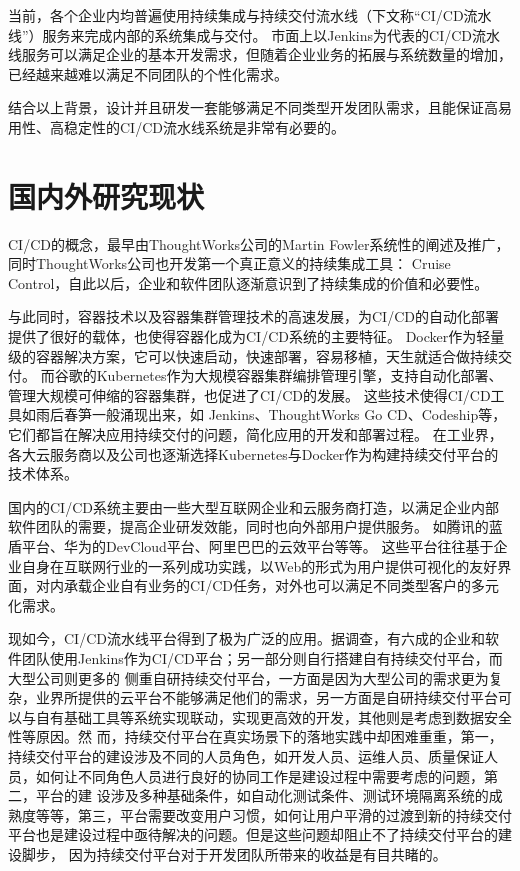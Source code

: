 当前，各个企业内均普遍使用持续集成与持续交付流水线（下文称“CI/CD流水线”）服务来完成内部的系统集成与交付\cite{1013369056.nh}。
市面上以Jenkins为代表的CI/CD流水线服务可以满足企业的基本开发需求，但随着企业业务的拓展与系统数量的增加，已经越来越难以满足不同团队的个性化需求。

结合以上背景，设计并且研发一套能够满足不同类型开发团队需求，且能保证高易用性、高稳定性的CI/CD流水线系统是非常有必要的。


\section{国内外研究现状}
CI/CD的概念，最早由ThoughtWorks公司的Martin Fowler系统性的阐述及推广\cite{CI首作}，同时ThoughtWorks公司也开发第一个真正意义的持续集成工具：
Cruise Control\cite{绪论持续集成1}，自此以后，企业和软件团队逐渐意识到了持续集成的价值和必要性。

与此同时，容器技术以及容器集群管理技术的高速发展，为CI/CD的自动化部署提供了很好的载体\cite{docker}，也使得容器化成为CI/CD系统的主要特征。
Docker作为轻量级的容器解决方案，它可以快速启动，快速部署，容易移植，天生就适合做持续交付。
而谷歌的Kubernetes作为大规模容器集群编排管理引擎，支持自动化部署、管理大规模可伸缩的容器集群，也促进了CI/CD的发展。
这些技术使得CI/CD工具如雨后春笋一般涌现出来，如 Jenkins、ThoughtWorks Go CD、Codeship等，它们都旨在解决应用持续交付的问题，简化应用的开发和部署过程。
在工业界，各大云服务商以及公司也逐渐选择Kubernetes与Docker作为构建持续交付平台的技术体系。

国内的CI/CD系统主要由一些大型互联网企业和云服务商打造，以满足企业内部软件团队的需要，提高企业研发效能，同时也向外部用户提供服务。
如腾讯的蓝盾平台、华为的DevCloud平台、阿里巴巴的云效平台等等。
这些平台往往基于企业自身在互联网行业的一系列成功实践，以Web的形式为用户提供可视化的友好界面，对内承载企业自有业务的CI/CD任务，对外也可以满足不同类型客户的多元化需求。

现如今，CI/CD流水线平台得到了极为广泛的应用。据调查，有六成的企业和软件团队使用Jenkins作为CI/CD平台\cite{DevOps中国调查研究}；另一部分则自行搭建自有持续交付平台，而大型公司则更多的
侧重自研持续交付平台，一方面是因为大型公司的需求更为复杂，业界所提供的云平台不能够满足他们的需求，另一方面是自研持续交付平台可以与自有基础工具等系统实现联动，实现更高效的开发，其他则是考虑到数据安全性等原因。然
而，持续交付平台在真实场景下的落地实践中却困难重重，第一，持续交付平台的建设涉及不同的人员角色，如开发人员、运维人员、质量保证人员，如何让不同角色人员进行良好的协同工作是建设过程中需要考虑的问题，第二，平台的建
设涉及多种基础条件，如自动化测试条件、测试环境隔离系统的成熟度等等\cite{rangnau2020continuous}，第三，平台需要改变用户习惯，如何让用户平滑的过渡到新的持续交付平台也是建设过程中亟待解决的问题。但是这些问题却阻止不了持续交付平台的建设脚步，
因为持续交付平台对于开发团队所带来的收益是有目共睹的。

